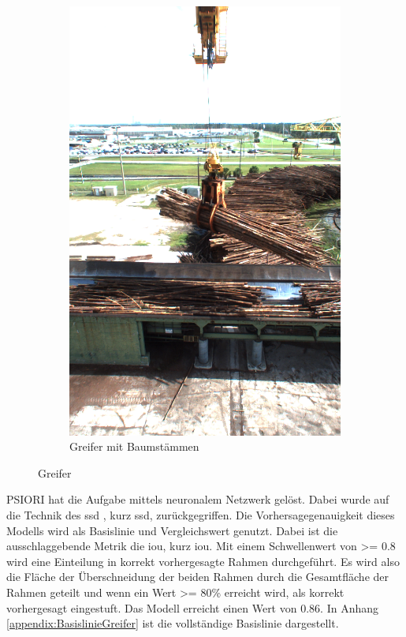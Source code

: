 \begin{figure}[h]
\begin{subfigure}[c]{0.49\textwidth}
		\end{subfigure}
		\begin{subfigure}[c]{0.49\textwidth}			
			\includegraphics[width=1\textwidth, center]{bilder/Grundlagen/Logs_14.png}
			\caption[Bsp. Bild: Greifer mit Baumstämmen]{Greifer mit Baumstämmen}
			\label{img:Logs}	
		\end{subfigure}
		\caption{Greifer}
		\label{img:Greifer}
	\end{figure}	
	PSIORI hat die Aufgabe mittels neuronalem Netzwerk gelöst. Dabei wurde auf die Technik des \acl{ssd} \cite{Liu.2015}, kurz \ac{ssd},  zurückgegriffen. Die Vorhersagegenauigkeit dieses Modells wird als Basislinie und Vergleichswert genutzt. Dabei ist die ausschlaggebende Metrik die \acl{iou}, kurz \ac{iou}. Mit einem Schwellenwert von >= 0.8 wird eine Einteilung in korrekt vorhergesagte Rahmen durchgeführt. Es wird also die Fläche der Überschneidung der beiden Rahmen durch die Gesamtfläche der Rahmen geteilt und wenn ein Wert >= 80\% erreicht wird, als korrekt vorhergesagt eingestuft. Das Modell erreicht einen Wert von $0.86$. In Anhang \ref{appendix:BasislinieGreifer} ist die vollständige Basislinie dargestellt.
	
